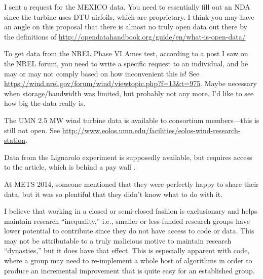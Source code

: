 

I sent a request for the MEXICO data. You need to essentially fill out an NDA
since the turbine uses DTU airfoils, which are proprietary. I think you may have
an angle on this proposal that there is almost no truly open data out there by
the definitions of \url{http://opendatahandbook.org/guide/en/what-is-open-data/}

To get data from the NREL Phase VI Ames test, according to a post I saw on the
NREL forum, you need to write a specific request to an individual, and he may or
may not comply based on how inconvenient this is! See
\url{https://wind.nrel.gov/forum/wind/viewtopic.php?f=13&t=975}. Maybe necessary
when storage/bandwidth was limited, but probably not any more. I'd like to see
how big the data really is.

The UMN 2.5 MW wind turbine data is available to consortium members---this is
still not open. See
\url{http://www.eolos.umn.edu/facilities/eolos-wind-research-station}.

Data from the Lignarolo experiment is supposedly available, but requires access
to the article, which is behind a pay wall \cite{Lignarolo2014}.

At METS 2014, someone mentioned that they were perfectly happy to share their
data, but it was so plentiful that they didn't know what to do with it.

I believe that working in a closed or semi-closed fashion is exclusionary and
helps maintain research ``inequality,'' i.e., smaller or less-funded research
groups have lower potential to contribute since they do not have access to code
or data. This may not be attributable to a truly malicious motive to maintain
research ``dynasties,'' but it does have that effect. This is especially
apparent with code, where a group may need to re-implement a whole host of
algorithms in order to produce an incremental improvement that is quite easy for
an established group.

